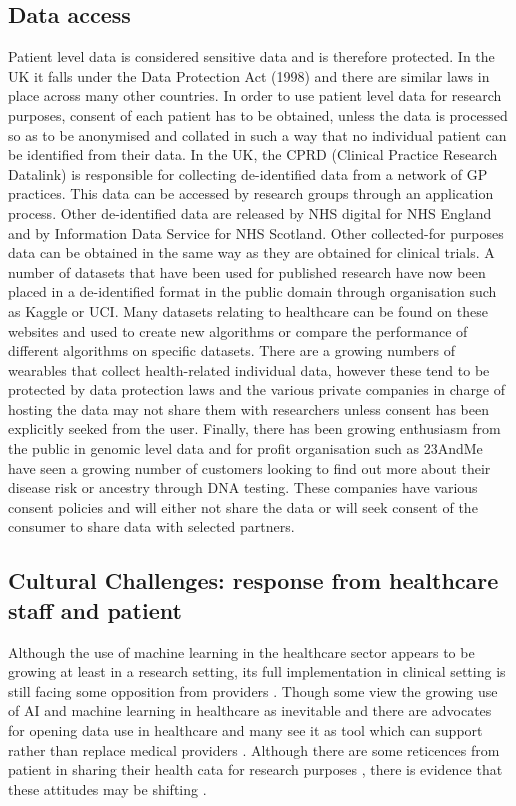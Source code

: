 \subsection{Data access}
Patient level data is considered sensitive data and is therefore protected. In the UK it falls under the Data Protection Act (1998) and there are similar laws in place across many other countries.\newline
In order to use patient level data for research purposes, consent of each patient has to be obtained, unless the data is processed so as to be anonymised and collated in such a way that no individual patient can be  identified from their data. In the UK, the CPRD (Clinical Practice Research Datalink) is responsible for collecting de-identified data from a network of GP practices. This data can be accessed by research groups through an application process. Other de-identified data are released by NHS digital for NHS England and by Information Data Service for NHS Scotland.
Other collected-for purposes data can be obtained in the same way as they are obtained for clinical trials. A number of datasets that have been used for published research have now been placed in a de-identified format in the public domain through organisation such as Kaggle or UCI. Many datasets relating to healthcare can be found on these websites and used to create new algorithms or compare the performance of different algorithms on specific datasets.
There are a growing numbers of wearables that collect health-related individual data, however these tend to be protected by data protection laws and the various private companies in charge of hosting the data may not share them with researchers unless consent has been explicitly seeked from the user. Finally, there has been growing enthusiasm from the public in genomic level data and for profit organisation such as 23AndMe have seen a growing number of customers looking to find out more about their disease risk or ancestry through DNA testing. These companies have various consent policies and will either not share the data or will seek consent of the consumer to share data with selected partners. 


\subsection{Cultural Challenges: response from healthcare staff and patient}
Although the use of machine learning in the healthcare sector appears to be growing at least in a research setting, its full implementation in clinical setting is still facing some opposition from providers \citep{Cabitza:2017hv}. Though some view the growing use of AI and machine learning in healthcare as inevitable \citep{Murdoch:2013hm} and there are advocates for opening data use in healthcare \citep{Kostkova:2016ur} and many see it as tool which can support rather than replace medical providers \citep{Pesapane:2018kv}.
Although there are some reticences from patient in sharing their health cata for research purposes \citep{Goldacre:tf}, there is evidence that these attitudes may be shifting \citep{Kostkova:2016ur}. 

